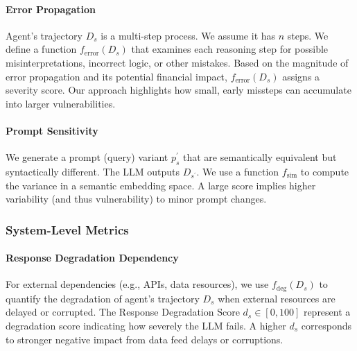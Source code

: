 \paragraph{Error Propagation}
Agent's trajectory $D_s$ is a multi-step process. We assume it has $n$ steps. We define a function $f_{\text{error}}(D_s)$ that examines each reasoning step for possible misinterpretations, incorrect logic, or other mistakes. Based on the magnitude of error propagation and its potential financial impact, $f_{\text{error}}(D_s)$ assigns a severity score. Our approach highlights how small, early missteps can accumulate into larger vulnerabilities.



\paragraph{Prompt Sensitivity}

We generate a prompt (query) variant $p_s^\prime$ that are semantically equivalent but syntactically different. The LLM outputs $D_{s^\prime}$. We use a function $f_{\text{sim}}$ to
compute the variance in a semantic embedding space.
A large score implies higher variability (and thus vulnerability) to minor prompt changes.

\subsubsection{System-Level Metrics}
\label{sec:system-level-metrics}
\paragraph{Response Degradation Dependency}

For external dependencies (e.g., APIs, data resources), we use $f_{\text{deg}}(D_s)$ to quantify the degradation of agent's trajectory $D_s$ when external resources are delayed or corrupted.
The Response Degradation Score $d_s \in [0,100]$ represent a degradation score indicating how severely the LLM fails. 
A higher $d_s$ corresponds to stronger negative impact from data feed delays or corruptions.

